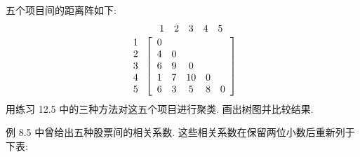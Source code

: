 \quad 五个项目间的距离阵如下:
\[
\begin{array}{r@{\;}c}
 & \begin{array}{ccccc}1&2&3&4&5\end{array}\\[2pt]
\begin{array}{r}1\\2\\3\\4\\5\end{array} &
\left[\begin{array}{ccccc}
0&&&&\\
4&0&&&\\
6&9&0&&\\
1&7&10&0&\\
6&3&5&8&0
\end{array}\right]
\end{array}
\]
用练习 12.5 中的三种方法对这五个项目进行聚类. 画出树图并比较结果.

\quad 例 8.5 中曾给出五种股票间的相关系数. 这些相关系数在保留两位小数后重新列于下表:
